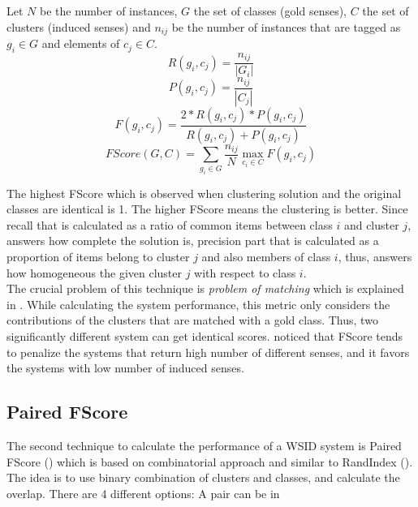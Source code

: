 Let $N$ be the number of instances, $G$ the set of classes (gold senses), $C$ the set of clusters (induced senses) and $n_{ij}$ be the number of instances that are tagged as $g_i \in G$ and elements of $c_j \in C$.  \\

\begin{equation}
R(g_i, c_j) = \dfrac{n_{ij}}{|G_i|}
\end{equation}
\begin{equation}
P(g_i, c_j) = \dfrac{n_{ij}}{|C_j|}
\end{equation}
\begin{equation}
F(g_i, c_j) = \dfrac{2 * R(g_i, c_j) * P(g_i, c_j)}{R(g_i, c_j) + P(g_i, c_j)}
\end{equation}
\begin{equation}
FScore(G, C) = \sum\limits_{g_i \in G} \dfrac{n_{ij}}{N} \max_{c_i \in C}{F(g_i, c_j)}
\end{equation}

The highest FScore which is observed when clustering solution and the original classes are identical is 1. The higher FScore means the clustering is better. Since recall that is calculated as a ratio of common items between class $i$ and cluster $j$, answers how complete the solution is, precision part that is calculated as a proportion of items belong to cluster $j$ and also members of class $i$, thus, answers how homogeneous the given cluster $j$ with respect to class $i$. \\

The crucial problem of this technique is \emph{problem of matching} which is explained in \cite{meilua03comparing}. 
While calculating the system performance, this metric only considers the contributions of the clusters that are matched with a gold class. Thus, two significantly different system can get identical scores. \cite{agirre07semeval} noticed that FScore tends to penalize the systems that return high number of different senses, and it favors the systems with low number of induced senses.



\subsection{Paired FScore}
The second technique to calculate the performance of a WSID system is Paired FScore (\cite{artiles09role}) which is based on combinatorial approach and similar to RandIndex (\cite{rand71objective}). The idea is to use binary combination of clusters and classes, and calculate the overlap. There are 4 different options: A pair can be in 

